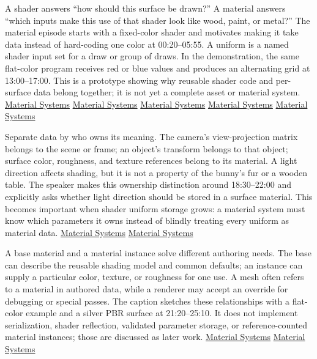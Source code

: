 A shader answers ``how should this surface be drawn?'' A material answers ``which inputs make this use of that shader look like wood, paint, or metal?'' The material episode starts with a fixed-color shader and motivates making it take data instead of hard-coding one color at 00:20--05:55. A uniform is a named shader input set for a draw or group of draws. In the demonstration, the same flat-color program receives red or blue values and produces an alternating grid at 13:00--17:00. This is a prototype showing why reusable shader code and per-surface data belong together; it is not yet a complete asset or material system. \href{https://www.youtube.com/watch?v=2k5FjtMNQsM&t=20s}{Material Systems} \href{https://www.youtube.com/watch?v=2k5FjtMNQsM&t=210s}{Material Systems} \href{https://www.youtube.com/watch?v=2k5FjtMNQsM&t=330s}{Material Systems} \href{https://www.youtube.com/watch?v=2k5FjtMNQsM&t=780s}{Material Systems} \href{https://www.youtube.com/watch?v=2k5FjtMNQsM&t=960s}{Material Systems}

Separate data by who owns its meaning. The camera's view-projection matrix belongs to the scene or frame; an object's transform belongs to that object; surface color, roughness, and texture references belong to its material. A light direction affects shading, but it is not a property of the bunny's fur or a wooden table. The speaker makes this ownership distinction around 18:30--22:00 and explicitly asks whether light direction should be stored in a surface material. This becomes important when shader uniform storage grows: a material system must know which parameters it owns instead of blindly treating every uniform as material data. \href{https://www.youtube.com/watch?v=2k5FjtMNQsM&t=1080s}{Material Systems} \href{https://www.youtube.com/watch?v=2k5FjtMNQsM&t=1230s}{Material Systems}

A base material and a material instance solve different authoring needs. The base can describe the reusable shading model and common defaults; an instance can supply a particular color, texture, or roughness for one use. A mesh often refers to a material in authored data, while a renderer may accept an override for debugging or special passes. The caption sketches these relationships with a flat-color example and a silver PBR surface at 21:20--25:10. It does not implement serialization, shader reflection, validated parameter storage, or reference-counted material instances; those are discussed as later work. \href{https://www.youtube.com/watch?v=2k5FjtMNQsM&t=1280s}{Material Systems} \href{https://www.youtube.com/watch?v=2k5FjtMNQsM&t=1440s}{Material Systems}

